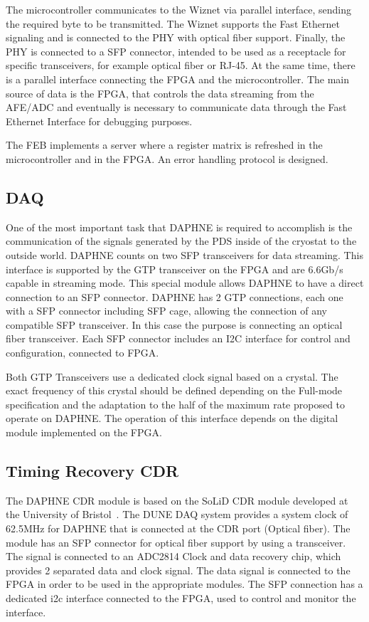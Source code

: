 The microcontroller communicates to the Wiznet via parallel interface, sending the required byte to be transmitted. The Wiznet supports the Fast Ethernet signaling and is connected to the PHY with optical fiber support. Finally, the PHY is connected to a SFP connector, intended to be used as a receptacle for specific transceivers, for example optical fiber or RJ-45. At the same time, there is a parallel interface connecting the FPGA and the microcontroller. The main source of data is the FPGA, that controls the data streaming from the AFE/ADC and eventually is necessary to communicate data through the Fast Ethernet Interface for debugging purposes. 

The FEB implements a server where a register matrix is refreshed in the microcontroller and in the FPGA. An error handling protocol is designed.

\subsection{DAQ}

One of the most important task that DAPHNE is required to accomplish is the communication of the signals generated by the PDS inside of the cryostat to the outside world. DAPHNE counts on two SFP transceivers for data streaming. This interface is supported by the GTP transceiver on the FPGA and are 6.6Gb/s capable in streaming mode. This special module allows DAPHNE to have a direct connection to an SFP connector. DAPHNE has 2 GTP connections, each one with a SFP connector including SFP cage, allowing the connection of any compatible SFP transceiver. In this case the purpose is connecting an optical fiber transceiver. Each SFP connector includes an I2C interface for control and configuration, connected to FPGA.

Both GTP Transceivers use a dedicated clock signal based on a crystal. The exact frequency of this crystal should be defined depending on the Full-mode specification and the adaptation to the half of the maximum rate proposed to operate on DAPHNE. The operation of this interface depends on the digital module implemented on the FPGA.

\subsection{Timing Recovery CDR}
The DAPHNE CDR module is based on the SoLiD CDR module developed at the University of Bristol~\cite{Arnold_2017}. The DUNE DAQ system provides a system clock of 62.5MHz for DAPHNE that is connected at the CDR port (Optical fiber). The module has an SFP connector for optical fiber support by using a transceiver. The signal is connected to an ADC2814 Clock and data recovery chip, which provides 2 separated data and clock signal. The data signal is connected to the FPGA in order to be used in the appropriate modules. The SFP connection has a dedicated i2c interface connected to the FPGA, used to control and monitor the interface.

